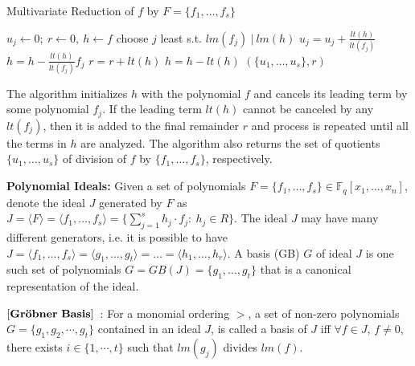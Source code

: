 \begin{algorithm}[H]
 \caption{Multivariate Reduction of $f$ by $F=\{f_1,\dots,f_s\}$}
 \label{algo:mv_reduce}
 \begin{algorithmic}[1]
 \State $u_j \gets 0; ~r \gets 0, ~h \gets f $ 
 \State choose $j$ least s.t. $lm(f_j) ~|~ lm(h)$
 \State $u_j = u_j + \frac{lt(h)}{lt(f_j)}$
 \State $h = h - \frac{lt(h)}{lt(f_j)} f_j$
 \Else
 \State $r = r+ lt(h)$
 \State $h = h - lt(h)$
 \EndIf
 \EndWhile
 \State \Return $(\{u_1,\dots,u_s\} , r)$
 \EndProcedure
 \end{algorithmic}
 \end{algorithm}

The algorithm initializes $h$ with the polynomial $f$ and cancels its leading term by some 
polynomial $f_j$. If the leading term $lt(h)$ cannot be canceled by any $lt(f_j)$, then it is added to the 
final remainder $r$ and process is repeated until all the terms in $h$ are analyzed. 
The algorithm also returns the set of quotients $\{u_1,\dots,u_s\}$ of division of $f$ by 
$\{f_1,\dots,f_s\}$, respectively. 

{\bf Polynomial Ideals:} Given a set of polynomials $F = \{f_1, 
\dots, f_s\}\in \mathbb{F}_q[x_1,\dots, x_n]$, denote the ideal
$J$ generated by $F$ as $J = \langle F \rangle = \langle f_1, \dots, f_s \rangle =
\{\sum_{j=1}^{s} h_j\cdot f_j: ~h_j \in R\}.$ The ideal $J$ may have
many different generators, i.e. it is possible to have 
$J = \langle f_1, \dots, f_s\rangle = \langle g_1, \dots, g_t \rangle
= \dots = \langle h_1,\dots, h_r\rangle$. A \Grobner basis (GB) $G$ of ideal
$J$ is one such set of polynomials $G = GB(J) = \{g_1, \dots, g_t\}$
that is a canonical representation of the ideal. 

\begin{Definition}
\label{def:gb}
$\bf{\left[Gr\ddot{o}bner\ Basis\right]}$~\cite{gb_book}: 
For a monomial ordering $>$, a set  of non-zero polynomials $G =
\{g_1,g_2,\cdots,g_t\}$ contained in an ideal $J$, is called a
\Grobner basis of $J$ iff 
$\forall f \in J$, $f\neq 0$, there exists $i \in \{1,\cdots, t\}$ such
that $lm(g_j)$ divides $lm(f)$.
\end{Definition}

